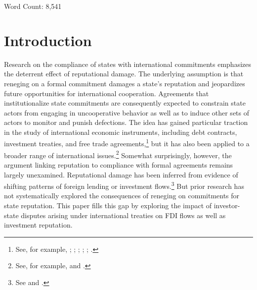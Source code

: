 \documentclass[12pt,onesided]{amsart}
\begin{document}
\vspace{10mm}

\begin{center}
Word Count: 8,541
\end{center}

\newpage

\setcounter{page}{1}
\doublespacing

\section*{Introduction}

Research on the compliance of states with international commitments emphasizes the deterrent effect of reputational damage. The underlying assumption is that reneging on a formal commitment damages a state's reputation and jeopardizes future opportunities for international cooperation. Agreements that institutionalize state commitments are consequently expected to constrain state actors from engaging in uncooperative behavior as well as to induce other sets of actors to monitor and punish defections. The idea has gained particular traction in the study of international economic instruments, including debt contracts, investment treaties, and free trade agreements,\footnote{See, for example, \citet{simmons:2000}; \citet{tomz:2007}; \citet{buthe:milner:2014}; \citet{buthe:milner:2008}; \citet{allee:peinhardt:2011}; \citet{elkins:etal:2006}.} but it has also been applied to a broader range of international issues.\footnote{See, for example, \citet{fearon:1997} and \citet{simmons:danner:2010}.} Somewhat surprisingly, however, the argument linking reputation to compliance with formal agreements remains largely unexamined. Reputational damage has been inferred from evidence of shifting patterns of foreign lending or investment flows.\footnote{See \citet{tomz:2007} and \citet{allee:peinhardt:2011}.} But prior research has not systematically explored the consequences of reneging on commitments for state reputation. This paper fills this gap by exploring the  impact of investor-state disputes arising under international treaties on FDI flows as well as investment reputation. 
\end{document}

